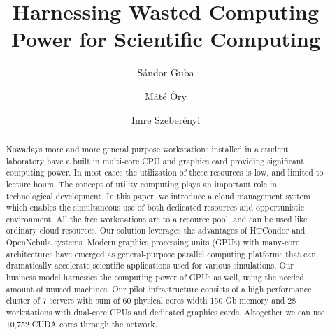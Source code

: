 \documentclass{llncs}
\begin{document}
%
\mainmatter              %
%
\title{Harnessing Wasted Computing Power for
Scientific Computing}
%
%
\author{S\'andor Guba \and M\'at\'e \H{O}ry \and Imre Szeber\'enyi}
%
%
%

\maketitle              %

\begin{abstract}

Nowadays more and more general purpose workstations installed in a student laboratory have a built in multi-core CPU and graphics card providing significant computing power. In most cases the utilization of these resources is low, and limited to lecture hours. The concept of utility computing plays an important role in technological development. 
In  this paper, we introduce a cloud management system which enables the simultaneous use of both dedicated resources and opportunistic environment. All the free workstations are to a resource pool, and can be used like ordinary cloud resources. Our solution leverages the advantages of HTCondor and OpenNebula systems.
Modern graphics processing units (GPUs) with many-core architectures have emerged as general-purpose parallel computing platforms that can dramatically accelerate scientific applications used for various simulations. Our business model harnesses the computing power of GPUs as well, using the needed amount of unused machines.
Our pilot infrastructure consists of a high performance cluster of 7 servers with sum of 60 physical cores width 150 Gb memory and 28 workstations with dual-core CPUs and dedicated graphics cards. Altogether we can use 10,752 CUDA cores through the network.


\end{abstract}
%
\end{document}

